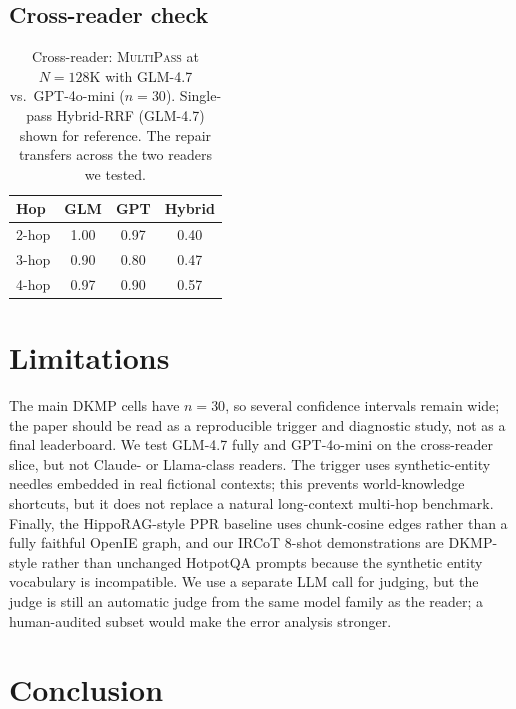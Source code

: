 \documentclass{article}
\theoremstyle{plain}
\theoremstyle{definition}
\newcommand{\ours}{\textsc{MultiPass}}
\begin{document}
\subsection{Cross-reader check}\label{sec:crossreader}

\begin{table}[t]
\centering
\caption{Cross-reader: \ours{} at $N{=}128$K with GLM-4.7 vs.\
GPT-4o-mini ($n{=}30$). Single-pass Hybrid-RRF (GLM-4.7) shown for
reference. The repair transfers across the two readers we tested.}
\label{tab:crossreader}
\small
\begin{tabular}{@{}lccc@{}}
\toprule
Hop & GLM & GPT & Hybrid \\
\midrule
2-hop & 1.00 & 0.97 & 0.40 \\
3-hop & 0.90 & 0.80 & 0.47 \\
4-hop & 0.97 & 0.90 & 0.57 \\
\bottomrule
\end{tabular}
\end{table}

\section{Limitations}\label{sec:limits}

The main DKMP cells have $n{=}30$, so several confidence intervals remain
wide; the paper should be read as a reproducible trigger and diagnostic
study, not as a final leaderboard. We test GLM-4.7 fully and GPT-4o-mini on
the cross-reader slice, but not Claude- or Llama-class readers. The trigger
uses synthetic-entity needles embedded in real fictional contexts; this
prevents world-knowledge shortcuts, but it does not replace a natural
long-context multi-hop benchmark. Finally, the HippoRAG-style PPR baseline
uses chunk-cosine edges rather than a fully faithful OpenIE graph, and our
IRCoT 8-shot demonstrations are DKMP-style rather than unchanged HotpotQA
prompts because the synthetic entity vocabulary is incompatible.
We use a separate LLM call for judging, but the judge is still an automatic
judge from the same model family as the reader; a human-audited subset
would make the error analysis stronger.

\section{Conclusion}\label{sec:conclusion}
\end{document}
